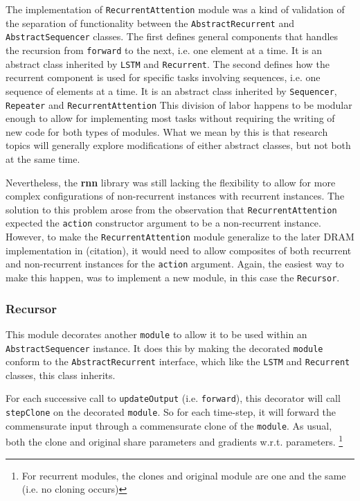 \documentclass{article} %
\providecommand{\inlinecode}[1]{\texttt{#1}}
\begin{document}
The implementation of \inlinecode{RecurrentAttention} module was a kind of validation of the
separation of functionality between the \inlinecode{AbstractRecurrent} and \inlinecode{AbstractSequencer} classes.
The first defines general components that handles the recursion from \inlinecode{forward} to the next, i.e. one element at a time.
It is an abstract class inherited by \inlinecode{LSTM} and \inlinecode{Recurrent}.
The second defines how the recurrent component is used for specific tasks involving sequences, i.e. one sequence of elements at a time.
It is an abstract class inherited by \inlinecode{Sequencer}, \inlinecode{Repeater} and \inlinecode{RecurrentAttention}
This division of labor happens to be modular enough to allow for implementing most tasks 
without requiring the writing of new code for both types of modules. What we mean by this is that 
research topics will generally explore modifications of either abstract classes, but not both at the same time.

Nevertheless, the \textbf{rnn} library was still lacking the flexibility
to allow for more complex configurations of non-recurrent instances with recurrent instances.
The solution to this problem arose from the observation that \inlinecode{RecurrentAttention} 
expected the \inlinecode{action} constructor argument to be a non-recurrent instance. 
However, to make the \inlinecode{RecurrentAttention} module 
generalize to the later DRAM implementation in (citation), it would need to allow 
composites of both recurrent and non-recurrent instances for the \inlinecode{action} argument. 
Again, the easiest way to make this happen, was to 
implement a new module, in this case the \inlinecode{Recursor}.

\subsubsection{Recursor}
This module decorates another \inlinecode{module} to allow it to be used within an \inlinecode{AbstractSequencer} instance. 
It does this by making the decorated \inlinecode{module} conform to the \inlinecode{AbstractRecurrent} interface, 
which like the \inlinecode{LSTM} and \inlinecode{Recurrent} classes, this class inherits.



For each successive call to \inlinecode{updateOutput} (i.e. \inlinecode{forward}), 
this decorator will call \inlinecode{stepClone} on the decorated \inlinecode{module}. 
So for each time-step, it will forward the commensurate input through a commensurate clone of the \inlinecode{module}. 
As usual, both the clone and original share parameters and gradients w.r.t. parameters.
\footnote{For recurrent modules, the clones and original module are one and the same (i.e. no cloning occurs)}
\end{document}
